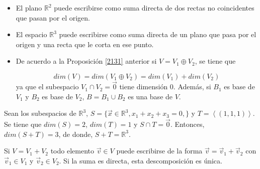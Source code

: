\bigskip

\begin{remark}
\begin{itemize}




\item 

El plano $\mathbb{R}^{2}$ puede escribirse como suma directa de dos rectas no coincidentes que pasan por el origen.

\item El espacio $\mathbb{R}^{3}$ puede escribirse como suma directa de un plano que pasa por el origen y una recta que le corta en ese punto.

\item De acuerdo a la Proposición \ref{2131} anterior  si $V=V_1 \oplus V_2$, se tiene que 

$$dim(V)=dim(V_1 \oplus V_2)=dim(V_1)+dim(V_2)$$
ya que el subespacio $V_1 \cap V_2={\vec{0}}$ tiene dimensión $0$. Además, si $B_1$ es base de $V_1$ y $B_2$ es base de $V_2$, $B=B_1\cup B_2$ es una base de $V$.

\end{itemize}
\end{remark}

\bigskip

\begin{example}
Sean los subespacios de $\mathbb{R}^3$, 
$S=\{ \vec{x} \in \mathbb{R}^3, x_1+x_2+x_3=0,\}$ y $T=\left\langle (1,1,1)\right\rangle$. Se tiene que $dim(S)=2$, $dim(T)=1$ y $S\cap T={\vec{0}}$. 
Entonces, $dim(S+T)=3$, de donde,  $S+T=\mathbb{R}^3$.
\end{example} 


\begin{remark}
Si $V=V_1 +V_2$ todo elemento $\vec{v}\in V$ puede escribirse de la forma $\vec{v}=\vec{v}_1+\vec{v}_2$ con $\vec{v}_1 \in V_1$ y $\vec{v}_2 \in V_2$. Si la suma es directa, esta descomposición es única. 
\end{remark}


 \bigskip



